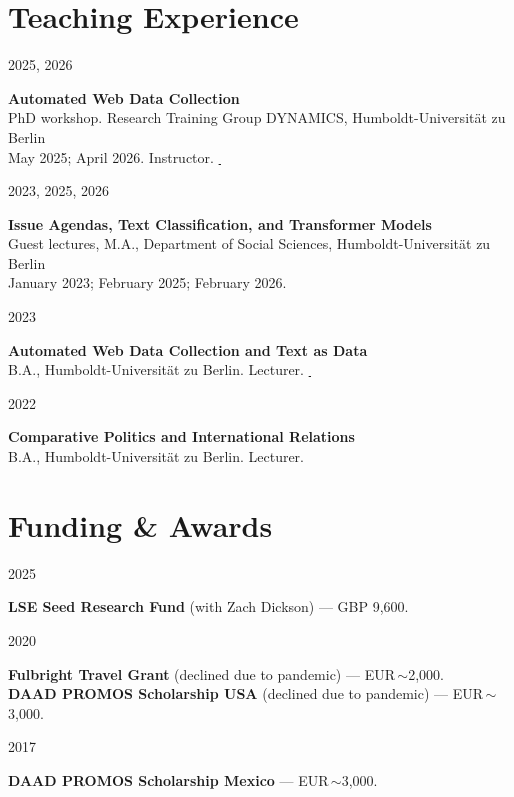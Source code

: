 \documentclass[11pt,a4paper]{article}
\newlength{\cvleftw}\setlength{\cvleftw}{0.20\textwidth}
\newlength{\cvrightw}\setlength{\cvrightw}{0.76\textwidth}
\newlength{\cvgap}\setlength{\cvgap}{0.02\textwidth}
\newenvironment{cventries}{\par\setlength{\parskip}{0pt}}{\par}
\newcommand{\cvitem}[2]{%
  \par\nopagebreak[2]%
  \noindent
  \begin{minipage}[t]{\cvleftw}\raggedright\color{cvmuted}\small\vspace{0pt}\strut #1\end{minipage}%
  \hspace{\cvgap}%
  \begin{minipage}[t]{\cvrightw}\raggedright\vspace{0pt}\strut #2\end{minipage}%
  \par\vspace{10pt plus 3pt minus 2pt}%
}
\newcommand{\cvtitle}[1]{\textbf{#1}}
\begin{document}
\section*{Teaching Experience}
\begin{cventries}
\cvitem{2025, 2026}{%
  \cvtitle{Automated Web Data Collection} \\
  PhD workshop. Research Training Group DYNAMICS, Humboldt-Universit\"at zu Berlin \\
  May 2025; April 2026. Instructor.
  \href{https://github.com/cornelius-erfort/automated-web-data-collection-2026}{\,\faGithub}}
\cvitem{2023, 2025, 2026}{%
  \cvtitle{Issue Agendas, Text Classification, and Transformer Models} \\
  Guest lectures, M.A., Department of Social Sciences, Humboldt-Universit\"at zu Berlin \\
  January 2023; February 2025; February 2026.}
\cvitem{2023}{%
  \cvtitle{Automated Web Data Collection and Text as Data} \\
  B.A., Humboldt-Universit\"at zu Berlin. Lecturer.
  \href{https://github.com/cornelius-erfort/web-data-and-text-r}{\,\faGithub}}
\cvitem{2022}{%
  \cvtitle{Comparative Politics and International Relations} \\
  B.A., Humboldt-Universit\"at zu Berlin. Lecturer.}
\end{cventries}

\section*{Funding \& Awards}
\begin{cventries}
\cvitem{2025}{\cvtitle{LSE Seed Research Fund} (with Zach Dickson) --- GBP 9{,}600.}
\cvitem{2020}{%
  \cvtitle{Fulbright Travel Grant} (declined due to pandemic) --- EUR\,$\sim$2{,}000.\\
  \cvtitle{DAAD PROMOS Scholarship USA} (declined due to pandemic) --- EUR\,$\sim$3{,}000.}
\cvitem{2017}{\cvtitle{DAAD PROMOS Scholarship Mexico} --- EUR\,$\sim$3{,}000.}
\end{cventries}

\end{document}
